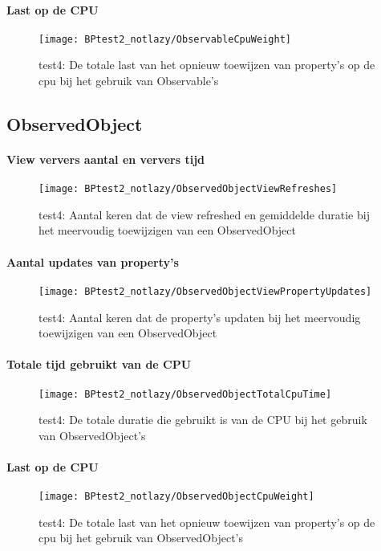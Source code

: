 \paragraph{Last op de CPU}
\begin{figure}[H]
    \centering
    \texttt{[image: BPtest2\_notlazy/ObservableCpuWeight]} 
    \caption{test4: De totale last van het opnieuw toewijzen van property's op de cpu bij het gebruik van Observable's}
    \label{fig:cpuWeightObservable3}
\end{figure}

\subsection{ObservedObject}
\paragraph{View ververs aantal en ververs tijd}
\begin{figure}[H]
    \centering
    \texttt{[image: BPtest2\_notlazy/ObservedObjectViewRefreshes]} 
    \caption{test4: Aantal keren dat de view refreshed en gemiddelde duratie bij het meervoudig toewijzigen van een ObservedObject}
    \label{fig:viewRefreshesObservedObject3}
\end{figure}
\paragraph{Aantal updates van property's}
\begin{figure}[H]
    \centering
    \texttt{[image: BPtest2\_notlazy/ObservedObjectViewPropertyUpdates]} 
    \caption{test4: Aantal keren dat de property's updaten bij het meervoudig toewijzigen van een ObservedObject}
    \label{fig:propertyUpdatesObservedObject3}
\end{figure}
\paragraph{Totale tijd gebruikt van de CPU}
\begin{figure}[H]
    \centering
    \texttt{[image: BPtest2\_notlazy/ObservedObjectTotalCpuTime]} 
    \caption{test4: De totale duratie die gebruikt is van de CPU bij het gebruik van ObservedObject's}
    \label{fig:cpuUsageTimeObservedObject3}
\end{figure}
\paragraph{Last op de CPU}
\begin{figure}[H]
    \centering
    \texttt{[image: BPtest2\_notlazy/ObservedObjectCpuWeight]} 
    \caption{test4: De totale last van het opnieuw toewijzen van property's op de cpu bij het gebruik van ObservedObject's}
    \label{fig:cpuWeightObservedObject3}
\end{figure}

